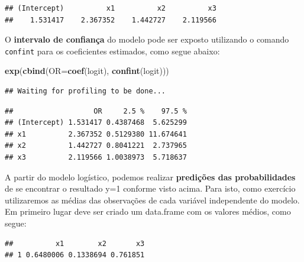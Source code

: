 \documentclass[12pt,brazil,]{book}
\newenvironment{Shaded}{\begin{snugshade}}{\end{snugshade}}
\newcommand{\DataTypeTok}[1]{\textcolor[rgb]{0.13,0.29,0.53}{#1}}
\newcommand{\KeywordTok}[1]{\textcolor[rgb]{0.13,0.29,0.53}{\textbf{#1}}}
\newcommand{\NormalTok}[1]{#1}
\newcommand{\OperatorTok}[1]{\textcolor[rgb]{0.81,0.36,0.00}{\textbf{#1}}}
\newcommand{\StringTok}[1]{\textcolor[rgb]{0.31,0.60,0.02}{#1}}
\begin{document}
\begin{verbatim}
## (Intercept)          x1          x2          x3 
##    1.531417    2.367352    1.442727    2.119566
\end{verbatim}

O \textbf{intervalo de confiança} do modelo pode ser exposto utilizando
o comando \texttt{confint} para os coeficientes estimados, como segue
abaixo:

\begin{Shaded}
\begin{Highlighting}[]
\KeywordTok{exp}\NormalTok{(}\KeywordTok{cbind}\NormalTok{(}\DataTypeTok{OR=}\KeywordTok{coef}\NormalTok{(logit), }\KeywordTok{confint}\NormalTok{(logit)))}
\end{Highlighting}
\end{Shaded}

\begin{verbatim}
## Waiting for profiling to be done...
\end{verbatim}

\begin{verbatim}
##                   OR     2.5 %    97.5 %
## (Intercept) 1.531417 0.4387468  5.625299
## x1          2.367352 0.5129380 11.674641
## x2          1.442727 0.8041221  2.737965
## x3          2.119566 1.0038973  5.718637
\end{verbatim}

A partir do modelo logístico, podemos realizar \textbf{predições das
probabilidades} de se encontrar o resultado y=1 conforme visto acima.
Para isto, como exercício utilizaremos as médias das observações de cada
variável independente do modelo. Em primeiro lugar deve ser criado um
data.frame com os valores médios, como segue:

\begin{Shaded}
\end{Shaded}

\begin{verbatim}
##          x1        x2       x3
## 1 0.6480006 0.1338694 0.761851
\end{verbatim}
\end{document}
